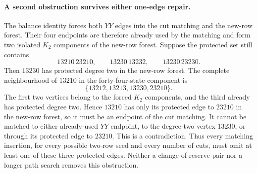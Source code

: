 \paragraph{A second obstruction survives either one-edge repair.}
The balance identity forces both $YY$ edges into the cut matching
and the new-row forest. Their four endpoints are therefore already
used by the matching and form two isolated $K_2$ components of the
new-row forest.
Suppose the protected set still contains
\[
 13210\,23210,\qquad13230\,13232,\qquad13230\,23230.
\]
Then $13230$ has protected degree two in the new-row forest.
The complete neighbourhood of $13210$ in the forty-four-state
component is
\[
 \{13212,13213,13230,23210\}.
\]
The first two vertices belong to the forced $K_2$ components, and
the third already has protected degree two. Hence $13210$ has only
its protected edge to $23210$ in the new-row forest, so it must be
an endpoint of the cut matching. It cannot be matched to either
already-used $YY$ endpoint, to the degree-two vertex $13230$, or
through its protected edge to $23210$. This is a contradiction.
Thus every matching insertion, for every possible two-row seed
and every number of cuts, must omit at least one of these three
protected edges. Neither a change of reserve pair nor a longer
path search removes this obstruction.
